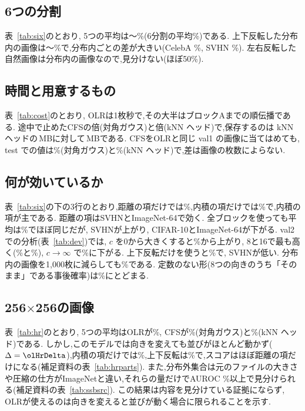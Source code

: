 \documentclass[MIRU,submit]{miru2025j}
\newcommand{\Ours}{OLR}   %
\begin{document}
\subsection{6つの分割}
\label{sec:six}
表~\ref{tab:six}のとおり, 5つの平均は\olSixMin{}〜\olSixMax\%(6分割の平均\olSixMean\%)である. 上下反転した分布内の画像は\olSixVfMin{}〜\olSixVfMax\%で,分布内ごとの差が大きい(CelebA \olSixVfCelebA\%, SVHN \olSixVfSVHN\%). 左右反転した自然画像は分布内の画像なので,見分けない(ほぼ50\%).

\subsection{時間と用意するもの}
\label{sec:cost}
表~\ref{tab:cost}のとおり, \Ours{}は1枚\olSecOL{}秒で,その大半はブロックAまでの順伝播である. 途中で止めたCFSの\olSecRatioCfs{}倍(対角ガウス)と\olSecRatioCfsKnn{}倍(kNN ヘッド)で,保存するのは kNN ヘッドの\olMBCfsKnn\,MBに対して\olMBOurs\,MBである. CFSを\Ours{}と同じ val1 の画像に当てはめても, test での値は\olCfsValMean\%(対角ガウス)と\olCfsKnnValMean\%(kNN ヘッド)で,差は画像の枚数によらない.

\subsection{何が効いているか}
\label{sec:ablate}
表~\ref{tab:six}の下の3行のとおり,距離の項だけでは\olSixT\%,内積の項だけでは\olSixL\%で,内積の項が主である. 距離の項はSVHNとImageNet-64で効く. 全ブロックを使っても平均は\olSixAll\%でほぼ同じだが, SVHNが上がり, CIFAR-10とImageNet-64が下がる. val2 での分析(表~\ref{tab:dev})では, $c$ を0から大きくすると\olDevCzero\%から上がり, 8と16で最も高く(\olDevCeight\%と\olDevCsixteen\%), $c\to\infty$ で\olDevCinf\%に下がる. 上下反転だけを使うと\olDevOv\%で, SVHNが低い. 分布内の画像を1{,}000枚に減らしても\olDevNthousand\%である. 定数のない形(8つの向きのうち「そのまま」である事後確率)は\olDevPk\%にとどまる.

\subsection{256{$\times$}256の画像}
\label{sec:hr}
表~\ref{tab:hr}のとおり, 5つの平均は\Ours{}が\olHrOL\%, CFSが\olHrCfs\%(対角ガウス)と\olHrCfsKnn\%(kNN ヘッド)である. しかし,このモデルでは向きを変えても並びがほとんど動かず($\Delta=\olHrDelta$),内積の項だけでは\olHrL\%,上下反転は\olHrOLVf\%で,スコアはほぼ距離の項だけになる(補足資料の表~\ref{tab:hrparts}). また,分布外集合は元のファイルの大きさや圧縮の仕方がImageNetと違い,それらの量だけでAUROC \olFactsMin\%以上で見分けられる(補足資料の表~\ref{tab:ssbsrc}). この結果は内容を見分けている証拠にならず, \Ours{}が使えるのは向きを変えると並びが動く場合に限られることを示す.
\end{document}

